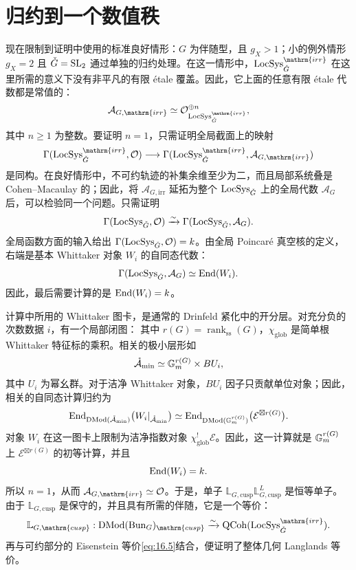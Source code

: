 \section{归约到一个数值秩}\label{sec:16.10}
现在限制到证明中使用的标准良好情形：$G$ 为伴随型，且 $g_X>1$；小的例外情形 $g_X=2$ 且 $\check{G}=\operatorname{SL}_2$ 通过单独的归约处理。在这一情形中，$\LocSys^{\mathrm{irr}}_{\checkG}$ 在这里所需的意义下没有非平凡的有限 étale 覆盖。因此，它上面的任意有限 étale 代数都是常值的：
\[\mathcal A_{G,\mathrm{irr}}\simeq\cO_{\LocSys^{\mathrm{irr}}_{\checkG}}^{\oplus n},\]
其中 $n\ge1$ 为整数。要证明 $n=1$，只需证明全局截面上的映射
\[\Gamma(\LocSys^{\mathrm{irr}}_{\checkG},\cO)\longrightarrow\Gamma(\LocSys^{\mathrm{irr}}_{\checkG},\mathcal A_{G,\mathrm{irr}})\]
是同构。在良好情形中，不可约轨迹的补集余维至少为二，而且局部系统叠是 Cohen–Macaulay 的；因此，将 $\mathcal A_{G,\mathrm{irr}}$ 延拓为整个 $\operatorname{LocSys}_{\check{G}}$ 上的全局代数 $\mathcal A_G$ 后，可以检验同一个问题。只需证明
\[\Gamma(\operatorname{LocSys}_{\check{G}},\mathcal{O})\xrightarrow{\sim}\Gamma(\operatorname{LocSys}_{\check{G}},\mathcal A_G).\]
全局函数方面的输入给出 $\Gamma(\operatorname{LocSys}_{\check{G}},\mathcal{O})=k$。由全局 Poincaré 真空核的定义，右端是基本 Whittaker 对象 $W_i$ 的自同态代数：
\[\Gamma(\operatorname{LocSys}_{\check{G}},\mathcal A_G)\simeq\operatorname{End}(W_i).\]
因此，最后需要计算的是 $\operatorname{End}(W_i)=k$。

计算中所用的 Whittaker 图卡，是通常的 Drinfeld 紧化中的开分层。对充分负的次数数据 $i$，有一个局部闭图：
其中 $r(G)=\operatorname{rank}_{\mathrm{ss}}(G)$，$\chi_{\mathrm{glob}}$ 是简单根 Whittaker 特征标的乘积。相关的极小层形如
\[\mathring{\mathcal A}_{\min}\simeq\mathbb{G}_{m}^{r(G)}\times BU_i,\]
其中 $U_i$ 为幂幺群。对于洁净 Whittaker 对象，$BU_i$ 因子只贡献单位对象；因此，相关的自同态计算归约为
\[\operatorname{End}_{\operatorname{DMod}(\mathring{\mathcal A}_{\min})}\bigl(W_i|_{\mathring{\mathcal A}_{\min}}\bigr)
\simeq\operatorname{End}_{\operatorname{DMod}(\mathbb{G}_{m}^{r(G)})}\bigl(\mathcal E^{\boxtimes r(G)}\bigr).\]
对象 $W_i$ 在这一图卡上限制为洁净指数对象 $\chi_{\mathrm{glob}}^!\mathcal E$。因此，这一计算就是 $\mathbb{G}_{m}^{r(G)}$ 上 $\mathcal E^{\boxtimes r(G)}$ 的初等计算，并且
\[\operatorname{End}(W_i)=k.\]
所以 $n=1$，从而 $\mathcal A_{G,\mathrm{irr}}\simeq\cO$。于是，单子 $\mathbb L_{G,\mathrm{cusp}}\mathbb L_{G,\mathrm{cusp}}^L$ 是恒等单子。由于 $\mathbb L_{G,\mathrm{cusp}}$ 是保守的，并且具有所需的伴随，它是一个等价：
\[\mathbb L_{G,\mathrm{cusp}}:\DMod(\Bun_G)_{\mathrm{cusp}}\xrightarrow{\sim}\QCoh(\LocSys^{\mathrm{irr}}_{\checkG}).\]
再与可约部分的 Eisenstein 等价\eqref{eq:16.5}结合，便证明了整体几何 Langlands 等价\cite{CCF24,ABC24b,GR24b}。

